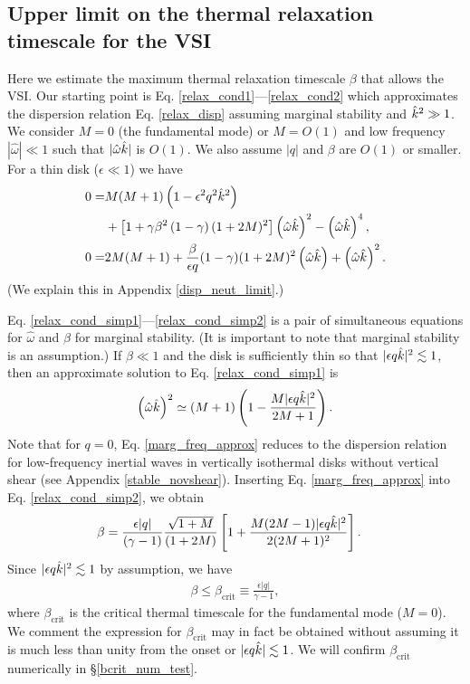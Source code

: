 \subsection{Upper limit on the thermal relaxation timescale for the
  VSI}\label{iso_vsi_beta_crit}
Here we estimate the maximum thermal relaxation timescale 
$\beta$ that allows the VSI.  
Our starting point is Eq. \ref{relax_cond1}---\ref{relax_cond2} which
approximates the dispersion relation Eq. \ref{relax_disp} assuming marginal
stability and $\hat{k}^2\gg 1$. We consider $M=0$ (the 
fundamental mode) or  $M=O(1)$ and low frequency $|\hat{\omega}|\ll
1$ such that $|\hat{\omega}\hat{k}|$ is $O(1)$. We 
also assume $|q|$ and $\beta$ are $O(1)$ or smaller. For a thin disk
($\epsilon \ll 1$) we have 
\begin{align}
 0 = &M(M+1)\left(1-\epsilon^2q^2\hat{k}^2\right) \notag\\ 
 &+ \left[1 +
    \gamma\beta^2\left(1-\gamma\right)(1+2M)^2\right]\left(\hat{\omega}\hat{k}\right)^2
   -  \left(\hat{\omega}\hat{k}\right)^4,\label{relax_cond_simp1}\\
   0= &2M(M+1) + \frac{\beta}{\epsilon q} (1-\gamma)(1+2M)^2
   \left(\hat{\omega}\hat{k}\right) + \left(\hat{\omega}\hat{k}\right)^2. \label{relax_cond_simp2}
\end{align}
(We explain this in Appendix \ref{disp_neut_limit}.)

Eq. \ref{relax_cond_simp1}---\ref{relax_cond_simp2} is a pair of
simultaneous equations for $\hat{\omega}$ and $\beta$ for marginal
stability. (It is important to note that marginal stability is an
assumption.) If $\beta\ll 1$ and the disk is sufficiently thin so that  
$|\epsilon q \hat{k} |^2\lesssim 1$, 
then an approximate solution to Eq. \ref{relax_cond_simp1} is 
\begin{align}
  \left(\hat{\omega}\hat{k}\right)^2 \simeq (M+1)\left(1 -
    \frac{M|\epsilon q \hat{k}|^2}{2M+1}\right).  \label{marg_freq_approx}
\end{align}
Note that for $q=0$, Eq. \ref{marg_freq_approx} reduces to 
the dispersion relation for low-frequency inertial waves in vertically
isothermal disks without vertical shear (see Appendix
\ref{stable_novshear}). Inserting Eq. \ref{marg_freq_approx} into
Eq. \ref{relax_cond_simp2}, we obtain 
\begin{align}\label{bcrit_gen}
  \beta &= \frac{\epsilon|q|}{(\gamma - 1)}
  \frac{\sqrt{1+M}}{(1+2M)}\left[1 + \frac{M(2M-1)|\epsilon q
      \hat{k}|^2}{2(2M+1)^2}\right].
\end{align}
Since $|\epsilon q \hat{k}|^2\lesssim 1$ by assumption, we have  
\begin{align}\label{iso_vsi_cond}
  \beta\leq \beta_\mathrm{crit}  \equiv
  \frac{\epsilon|q|}{\gamma-1}, 
\end{align}
where $\beta_\mathrm{crit}$ is the critical thermal timescale for
the fundamental mode ($M=0$). 
We comment the expression for $\beta_\mathrm{crit}$ may in fact be
obtained without assuming it is much less than unity from the onset or
$|\epsilon q\hat{k}|\lesssim 1$. %
We will  
confirm $\beta_\mathrm{crit}$ numerically in \S\ref{bcrit_num_test}. 

